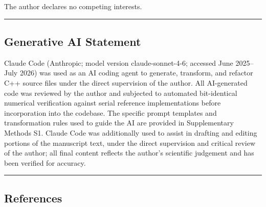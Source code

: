 \documentclass[
  11pt,
]{article}
\begin{document}
The author declares no competing interests.

\begin{center}\rule{0.5\linewidth}{0.5pt}\end{center}

\subsection{Generative AI Statement}\label{generative-ai-statement}

Claude Code (Anthropic; model version claude-sonnet-4-6; accessed June
2025--July 2026) was used as an AI coding agent to generate, transform,
and refactor C++ source files under the direct supervision of the
author. All AI-generated code was reviewed by the author and subjected
to automated bit-identical numerical verification against serial
reference implementations before incorporation into the codebase. The
specific prompt templates and transformation rules used to guide the AI
are provided in Supplementary Methods S1. Claude Code was additionally
used to assist in drafting and editing portions of the manuscript text,
under the direct supervision and critical review of the author; all
final content reflects the author's scientific judgement and has been
verified for accuracy.

\begin{center}\rule{0.5\linewidth}{0.5pt}\end{center}

\subsection{References}\label{references}
\end{document}
